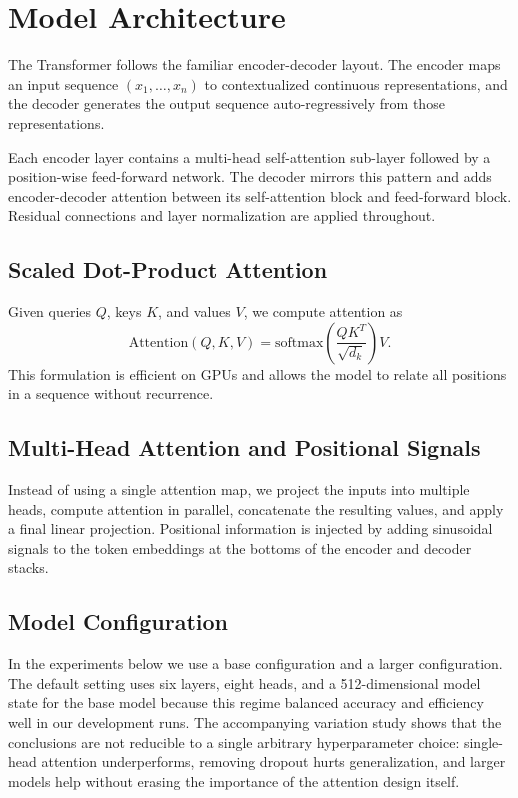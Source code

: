 \section{Model Architecture}

The Transformer follows the familiar encoder-decoder layout. The encoder maps an input sequence $(x_1, \ldots, x_n)$ to contextualized continuous representations, and the decoder generates the output sequence auto-regressively from those representations.

Each encoder layer contains a multi-head self-attention sub-layer followed by a position-wise feed-forward network. The decoder mirrors this pattern and adds encoder-decoder attention between its self-attention block and feed-forward block. Residual connections and layer normalization are applied throughout.

\subsection{Scaled Dot-Product Attention}

Given queries $Q$, keys $K$, and values $V$, we compute attention as
\[
\mathrm{Attention}(Q, K, V) = \mathrm{softmax}\left(\frac{QK^T}{\sqrt{d_k}}\right)V.
\]
This formulation is efficient on GPUs and allows the model to relate all positions in a sequence without recurrence.

\subsection{Multi-Head Attention and Positional Signals}

Instead of using a single attention map, we project the inputs into multiple heads, compute attention in parallel, concatenate the resulting values, and apply a final linear projection. Positional information is injected by adding sinusoidal signals to the token embeddings at the bottoms of the encoder and decoder stacks.

\subsection{Model Configuration}

In the experiments below we use a base configuration and a larger configuration. The default setting uses six layers, eight heads, and a 512-dimensional model state for the base model because this regime balanced accuracy and efficiency well in our development runs. The accompanying variation study shows that the conclusions are not reducible to a single arbitrary hyperparameter choice: single-head attention underperforms, removing dropout hurts generalization, and larger models help without erasing the importance of the attention design itself.
